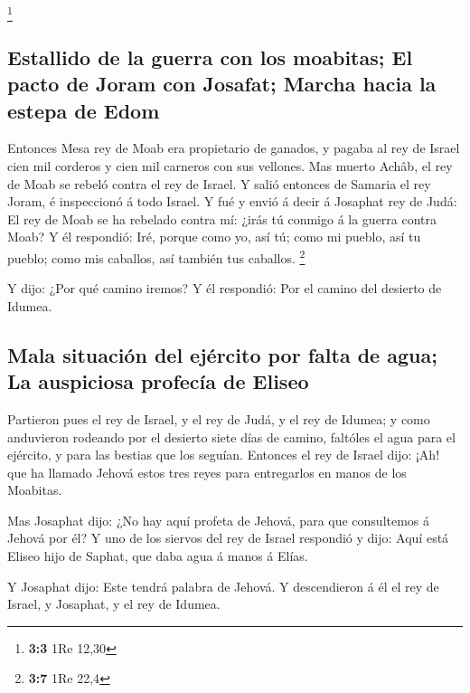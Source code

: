 \footnote{\textbf{3:3} 1Re 12,30}

\hypertarget{estallido-de-la-guerra-con-los-moabitas-el-pacto-de-joram-con-josafat-marcha-hacia-la-estepa-de-edom}{%
\subsection{Estallido de la guerra con los moabitas; El pacto de Joram
con Josafat; Marcha hacia la estepa de
Edom}\label{estallido-de-la-guerra-con-los-moabitas-el-pacto-de-joram-con-josafat-marcha-hacia-la-estepa-de-edom}}

 Entonces Mesa rey de Moab era propietario de ganados, y
pagaba al rey de Israel cien mil corderos y cien mil carneros con sus
vellones.  Mas muerto Achâb, el rey de Moab se rebeló
contra el rey de Israel.  Y salió entonces de Samaria el
rey Joram, é inspeccionó á todo Israel.  Y fué y envió á
decir á Josaphat rey de Judá: El rey de Moab se ha rebelado contra mí:
¿irás tú conmigo á la guerra contra Moab? Y él respondió: Iré, porque
como yo, así tú; como mi pueblo, así tu pueblo; como mis caballos, así
también tus caballos. \footnote{\textbf{3:7} 1Re 22,4}

 Y dijo: ¿Por qué camino iremos? Y él respondió: Por el
camino del desierto de Idumea.

\hypertarget{mala-situaciuxf3n-del-ejuxe9rcito-por-falta-de-agua-la-auspiciosa-profecuxeda-de-eliseo}{%
\subsection{Mala situación del ejército por falta de agua; La auspiciosa
profecía de
Eliseo}\label{mala-situaciuxf3n-del-ejuxe9rcito-por-falta-de-agua-la-auspiciosa-profecuxeda-de-eliseo}}

 Partieron pues el rey de Israel, y el rey de Judá, y el
rey de Idumea; y como anduvieron rodeando por el desierto siete días de
camino, faltóles el agua para el ejército, y para las bestias que los
seguían.  Entonces el rey de Israel dijo: ¡Ah! que ha
llamado Jehová estos tres reyes para entregarlos en manos de los
Moabitas.

 Mas Josaphat dijo: ¿No hay aquí profeta de Jehová, para
que consultemos á Jehová por él? Y uno de los siervos del rey de Israel
respondió y dijo: Aquí está Eliseo hijo de Saphat, que daba agua á manos
á Elías.

 Y Josaphat dijo: Este tendrá palabra de Jehová. Y
descendieron á él el rey de Israel, y Josaphat, y el rey de Idumea.

